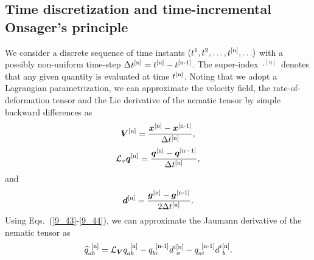 


\subsection{Time discretization and time-incremental Onsager's principle}

We consider a discrete sequence of time instants $(t^1,t^2, \ldots , t^{[\textup{n}]}, \ldots)$ with a possibly non-uniform time-step $\Delta t^{[\textup{n}]} = t^{[\textup{n}]}- t^{[\textup{n-1}]}$. The super-index $\cdot^{[n]}$ denotes that any given quantity is evaluated at time $t^{[\textup{n}]}$. Noting that we adopt a Lagrangian parametrization, we can approximate the velocity field, the rate-of-deformation tensor and the Lie derivative of the nematic tensor by simple backward differences as  
   \begin{equation} \label{9_42}
  \bm{V}^{[\textup{n}]} = \frac{\bm{x}^{[\textup{n}]} - \bm{x}^{[\textup{n-1}]}}{\Delta t^{[\textup{n}]}},
  \end{equation}
 \begin{equation}  \label{9_43}
 \mathcal{L}_v \bm{q}^{[\textup{n}]} = \frac{\bm{q}^{[\textup{n}]}- \bm{q}^{[\textup{n}-1]}}{\Delta t^{[\textup{n}]}},
 \end{equation}
 and
  \begin{equation}  \label{9_44}
     \bm{d}^{[\textup{n}]} =  \frac{\bm{g}^{[\textup{n}]} - \bm{g}^{[\textup{n-1}]}}{2\Delta t^{[\textup{n}]}}.
 \end{equation}
 Using Eqs.~(\ref{9_43}-\ref{9_44}), we can approximate the Jaumann derivative  of the nematic tensor as
 \begin{equation} \label{9_45}
     \widehat{q}_{ab}^{~[\textup{n}]} = \mathcal{L}_{\bm{V}} q^{~[\textup{n}]}_{ab} -  q_{bi}^{~[\textup{n-1}]}d^{i [\textup{n}]}_{~a} - q_{ai}^{~[\textup{n-1}]}d^{i [\textup{n}]}_{~b}.
 \end{equation}


